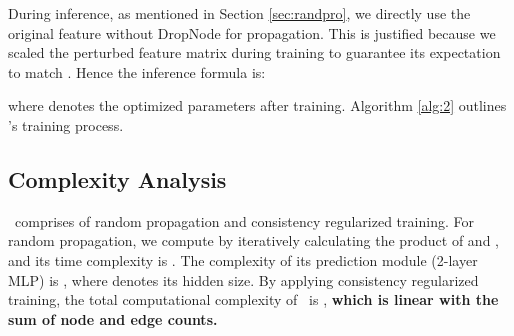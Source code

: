 {During inference, as mentioned in Section \ref{sec:randpro}, we directly use the original feature  without DropNode for propagation. 
This is justified because we scaled  the perturbed feature matrix  during training to guarantee its expectation to match . 
Hence the inference formula is:

where  denotes the optimized parameters after training. 
Algorithm \ref{alg:2} outlines \model's training process.  


\subsection{Complexity Analysis} 
\model\ comprises of random propagation and consistency regularized training. 
For random propagation, we compute  by iteratively calculating the product of  and , and its time complexity is . 
The complexity of its prediction module (2-layer MLP) is , where  denotes its hidden size. 
By applying consistency regularized training, the total computational complexity of \model\ is , \textbf{which is linear with the sum of node and edge counts.
}


}









































































